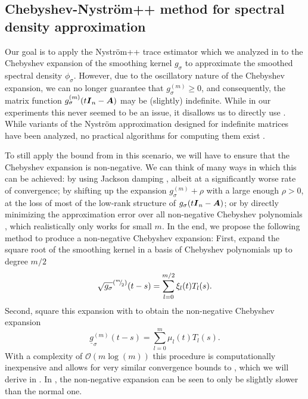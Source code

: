 \documentclass[12pt]{article}
\begin{document}
\subsection{Chebyshev-Nyström++ method for spectral density approximation}
\label{subsec:chebyshev-nystrom}

Our goal is to apply the Nyström++ trace estimator which we analyzed in  to the Chebyshev expansion of the smoothing kernel $g_{\sigma}$ to approximate the smoothed spectral density $\phi_{\sigma}$. However, due to the oscillatory nature of the Chebyshev expansion, we can no longer guarantee that $g_{\sigma}^{(m)} \geq 0$, and consequently, the matrix function $g_{\sigma}^{(m)}(t \boldsymbol{I}_n - \boldsymbol{A})$ may be (slightly) indefinite. While in our experiments this never seemed to be an issue, it disallows us to directly use . While variants of the Nyström approximation designed for indefinite matrices have been analyzed, no practical algorithms for computing them exist \cite{nakatsukasa-2023-randomized-lowrank}.

To still apply the bound from  in this scenario, we will have to ensure that the Chebyshev expansion is non-negative. We can think of many ways in which this can be achieved: by using Jackson damping \cite{jackson-1912-approximation-trigonometric,braverman-2022-sublinear-time}, albeit at a significantly worse rate of convergence; by shifting up the expansion $g_{\sigma}^{(m)} + \rho$ with a large enough $\rho > 0$, at the loss of most of the low-rank structure of $g_{\sigma}(t \boldsymbol{I}_n - \boldsymbol{A})$; or by directly minimizing the approximation error over all non-negative Chebyshev polynomials \cite{fejer-1916-uber-trigonometrische}, which realistically only works for small $m$. In the end, we propose the following method to produce a non-negative Chebyshev expansion: First, expand the square root of the smoothing kernel in a basis of Chebyshev polynomials up to degree $m/2$
\begin{equation}
    \sqrt{g_{\sigma}}^{({}^{m}{\mskip -5mu/\mskip -3mu}_{2})}(t - s) = \sum_{l=0}^{m/2} \xi_l(t) T_l(s).
\end{equation}
Second, square this expansion with  to obtain the non-negative Chebyshev expansion
\begin{equation}
    \underline{g}^{(m)}_{\sigma}(t - s) = \sum_{l=0}^{m} \mu_l(t) T_l(s).
    \label{equ:non-negative-chebyshev-expansion}
\end{equation}
With a complexity of $\mathcal{O}(m \log(m))$ this procedure is computationally inexpensive and allows for very similar convergence bounds to , which we will derive in . In , the non-negative expansion can be seen to only be slightly slower than the normal one.
\end{document}
